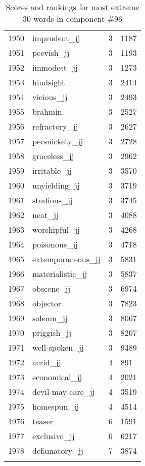 \begin{longtable}[!htbp]{| rlr@{.}l |}
    1950 & imprudent\_jj & 3 & 1187 \\
    1951 & peevish\_jj & 3 & 1193 \\
    1952 & immodest\_jj & 3 & 1273 \\
    1953 & hindsight & 3 & 2414 \\
    1954 & vicious\_jj & 3 & 2493 \\
    1955 & brahmin & 3 & 2527 \\
    1956 & refractory\_jj & 3 & 2627 \\
    1957 & persnickety\_jj & 3 & 2728 \\
    1958 & graceless\_jj & 3 & 2962 \\
    1959 & irritable\_jj & 3 & 3570 \\
    1960 & unyielding\_jj & 3 & 3719 \\
    1961 & studious\_jj & 3 & 3745 \\
    1962 & neat\_jj & 3 & 4088 \\
    1963 & worshipful\_jj & 3 & 4268 \\
    1964 & poisonous\_jj & 3 & 4718 \\
    1965 & extemporaneous\_jj & 3 & 5831 \\
    1966 & materialistic\_jj & 3 & 5837 \\
    1967 & obscene\_jj & 3 & 6974 \\
    1968 & objector & 3 & 7823 \\
    1969 & solemn\_jj & 3 & 8067 \\
    1970 & priggish\_jj & 3 & 8207 \\
    1971 & well-spoken\_jj & 3 & 9489 \\
    1972 & acrid\_jj & 4 & 891 \\
    1973 & economical\_jj & 4 & 2021 \\
    1974 & devil-may-care\_jj & 4 & 3519 \\
    1975 & homespun\_jj & 4 & 4514 \\
    1976 & teaser & 6 & 1591 \\
    1977 & exclusive\_jj & 6 & 6217 \\
    1978 & defamatory\_jj & 7 & 3874 \\
    \hline
    \caption{Scores and rankings for most extreme 30 words in component \#96} \\
\end{longtable}
